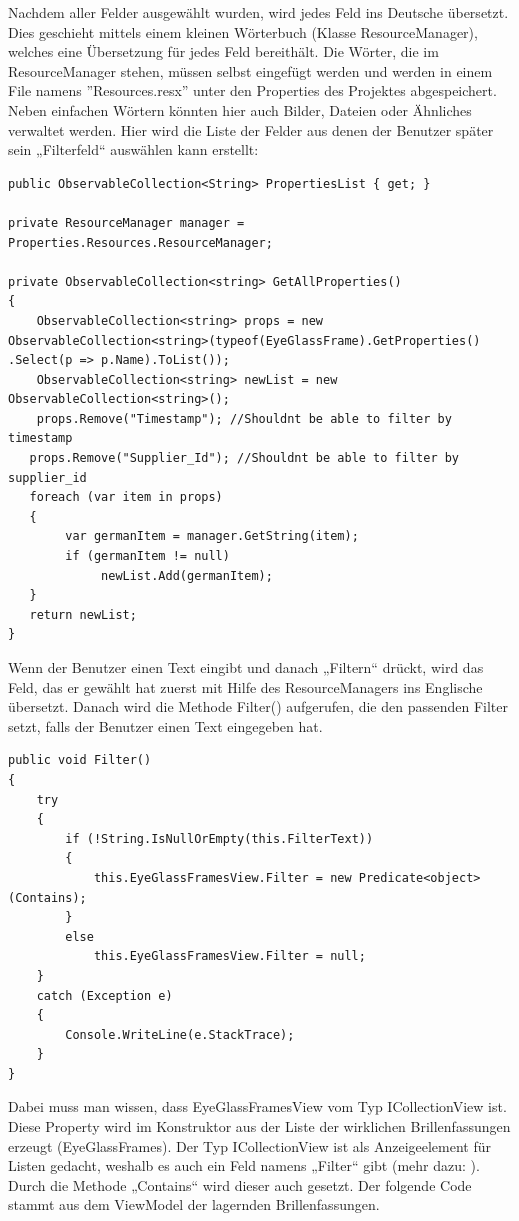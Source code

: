 \newline Nachdem aller Felder ausgewählt wurden, wird jedes Feld ins Deutsche übersetzt. Dies geschieht mittels einem kleinen Wörterbuch (Klasse ResourceManager), welches eine Übersetzung für jedes Feld bereithält. Die Wörter, die im ResourceManager stehen, müssen selbst eingefügt werden und werden in einem File namens ''Resources.resx'' unter den Properties des Projektes abgespeichert. Neben einfachen Wörtern könnten hier auch Bilder, Dateien oder Ähnliches verwaltet werden. \newline Hier wird die Liste der Felder aus denen der Benutzer später sein „Filterfeld“ auswählen kann erstellt:
\begin{lstlisting}
public ObservableCollection<String> PropertiesList { get; }

private ResourceManager manager = Properties.Resources.ResourceManager;

private ObservableCollection<string> GetAllProperties()
{
	ObservableCollection<string> props = new 							ObservableCollection<string>(typeof(EyeGlassFrame).GetProperties()
.Select(p => p.Name).ToList());
	ObservableCollection<string> newList = new ObservableCollection<string>();
	props.Remove("Timestamp"); //Shouldnt be able to filter by timestamp
   props.Remove("Supplier_Id"); //Shouldnt be able to filter by supplier_id
   foreach (var item in props)
   {
   		var germanItem = manager.GetString(item);
   		if (germanItem != null)
             newList.Add(germanItem);
   }
   return newList;
}
\end{lstlisting}
Wenn der Benutzer einen Text eingibt und danach „Filtern“ drückt, wird das Feld, das er gewählt hat zuerst mit Hilfe des ResourceManagers ins Englische übersetzt.  Danach wird die Methode Filter() aufgerufen, die den passenden Filter setzt, falls der Benutzer einen Text eingegeben hat.
\begin{lstlisting}
public void Filter()
{
	try
	{
		if (!String.IsNullOrEmpty(this.FilterText))
		{
			this.EyeGlassFramesView.Filter = new Predicate<object>(Contains);
		}
		else
			this.EyeGlassFramesView.Filter = null;
	}
	catch (Exception e)
	{
		Console.WriteLine(e.StackTrace);
	}
}
\end{lstlisting}
Dabei muss man wissen, dass EyeGlassFramesView vom Typ ICollectionView ist. Diese Property wird im Konstruktor aus der Liste der wirklichen Brillenfassungen erzeugt (EyeGlassFrames). Der Typ ICollectionView ist als Anzeigeelement für Listen gedacht, weshalb es auch ein Feld namens „Filter“ gibt (mehr dazu: \cite{microsoft_collectionview.filter-eigenschaft_2017}). Durch die Methode „Contains“ wird dieser auch gesetzt. Der folgende Code stammt aus dem ViewModel der lagernden Brillenfassungen.
